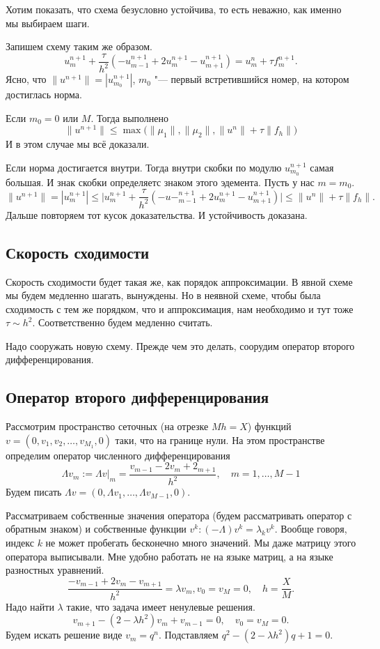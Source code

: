 Хотим показать, что схема безусловно устойчива, то есть неважно, как именно мы выбираем шаги.

Запишем схему таким же образом. 
\[
  u_m^{n+1}  + \frac{\tau}{h^2} (-u_{m-1}^{n+1} + 2 u_m^{n+1} - u_{m+1}^{n+1}) = u_m^n + \tau f_m^{n+1}.
\]
Ясно, что $\|u^{n+1}\| = |u_{m_0}^{n+1}|$, $m_0 $ "--- первый встретившийся номер, на котором достиглась норма.

Если $m_0 = 0$ или $M$. Тогда выполнено
\[
  \|u^{n+1}\| \le \max\big(\|\mu_1\|,\|\mu_2\|,\|u^n\| + \tau\|f_h\|\big)
\] 
И в этом случае мы всё доказали.

Если норма достигается внутри. Тогда внутри скобки по модулю $u_{m_0}^{n+1}$ самая большая. И знак скобки определяетс знаком этого эдемента. Пусть у нас $m=m_0$.
\[
  \|u^{n+1}\| = |u_{m}^{n+1}| \le \bigg| u^{n+1}_m+\frac{\tau}{h^2} (-u-^{n+1}_{m-1} + 2u_m^{n+1} - u_{m+1}^{n+1})\bigg|\le \|u^n\| + \tau\|f_h\|.
\]
Дальше повторяем тот кусок доказательства. И устойчивость доказана.

\subsection{Скорость сходимости}
Скорость сходимости будет такая же, как порядок аппроксимации. В явной схеме мы будем медленно шагать, вынуждены. Но в неявной схеме, чтобы была сходимость с тем же порядком, что и аппроксимация, нам необходимо и тут тоже $\tau\sim h^2$. Соответственно будем медленно считать.

Надо сооружать новую схему. Прежде чем это делать, соорудим оператор второго дифференцирования.
\subsection{Оператор второго дифференцирования}
Рассмотрим пространство сеточных (на отрезке $Mh = X$) функций $v = (0,v_1,v_2,\dots,v_{M_1},0)$ таки, что на границе нули. На этом пространстве определим оператор численного дифференцирования
\[
  \Lambda v_m := \Lambda v\big|_m = \frac{ v_{m-1} - 2v_m + 2_{m+1}}{h^2}, \quad m=1,\dots,M-1
\]
 Будем писать $\Lambda v = (0,\Lambda v_1,\dots, \Lambda v_{M-1},0)$.

Рассматриваем собственные значения оператора (будем рассматривать оператор с обратным знаком) и собственные функции $v^k\colon (-\Lambda) v^k = \lambda_k v^k$. Вообще говоря, индекс $k$ не может пробегать бесконечно много значений. Мы даже матрицу этого оператора выписывали. Мне удобно работать не на языке матриц, а на языке разностных уравнений.
\[
  \frac{-v_{m-1} + 2 v_m - v_{m+1}}{h^2} = \lambda v_m, v_0=v_M=0,\quad h = \frac XM.
\]
Надо найти $\lambda$ такие, что задача имеет ненулевые решения.
\[
  v_{m+1} - (2-\lambda h^2) v_m + v_{m-1} = 0,\quad v_0 = v_M = 0.
\]
Будем искать решение  виде $v_m = q^n$. Подставляем $q^2 - (2-\lambda h^2) q +1=0$.

